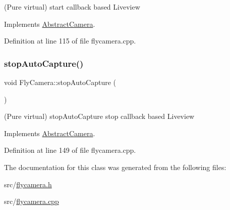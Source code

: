 (Pure virtual) start callback based Liveview 



Implements \mbox{\hyperlink{class_abstract_camera_a2f47d9877c5308856f42c94723faca33}{Abstract\+Camera}}.



Definition at line 115 of file flycamera.\+cpp.

\mbox{\label{class_fly_camera_a7d637bd9237fae3ee3cd55b044ec80f1}} 
\subsubsection{\texorpdfstring{stopAutoCapture()}{stopAutoCapture()}}
{\footnotesize\ttfamily void Fly\+Camera\+::stop\+Auto\+Capture (\begin{DoxyParamCaption}{ }\end{DoxyParamCaption})\hspace{0.3cm}{\ttfamily [virtual]}}



(Pure virtual) stop\+Auto\+Capture stop callback based Liveview 



Implements \mbox{\hyperlink{class_abstract_camera_a08bd5e2c3f8a92187f36e1f6322eccb5}{Abstract\+Camera}}.



Definition at line 149 of file flycamera.\+cpp.



The documentation for this class was generated from the following files\+:\begin{DoxyCompactItemize}
\item 
src/\mbox{\hyperlink{flycamera_8h}{flycamera.\+h}}\item 
src/\mbox{\hyperlink{flycamera_8cpp}{flycamera.\+cpp}}\end{DoxyCompactItemize}
